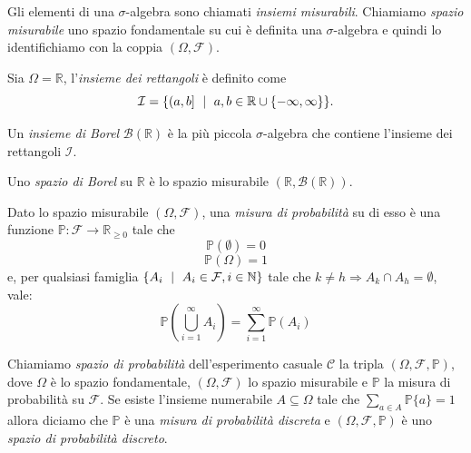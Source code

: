 Gli elementi di una $\sigma$-algebra sono chiamati \emph{insiemi misurabili}. Chiamiamo \emph{spazio misurabile} uno spazio fondamentale su cui è definita una $\sigma$-algebra e quindi lo identifichiamo con la coppia $(\Omega, \mathcal{F})$.

\begin{mtdef}
	Sia $\Omega=\mathbb{R}$, l'\emph{insieme dei rettangoli} è definito come $$ \mathcal{I} = \{(a,b] \mbox{ }\mid\mbox{ } a,b\in \mathbb{R} \cup \{-\infty,\infty\}\}. $$
\end{mtdef}

\begin{mtdef}
	Un \emph{insieme di Borel} $\mathcal{B}(\mathbb{R})$ è la più piccola $\sigma$-algebra che contiene l'insieme dei rettangoli $\mathcal{I}$.
\end{mtdef}

\begin{mtdef}
	Uno \emph{spazio di Borel} su $\mathbb{R}$ è lo spazio misurabile $(\mathbb{R},\mathcal{B}(\mathbb{R}))$.
\end{mtdef}

\begin{mtdef}
	Dato lo spazio misurabile $(\Omega,\mathcal{F})$, una \emph{misura di probabilità} su di esso è una funzione $\mathbb{P} : \mathcal{F} \rightarrow \mathbb{R}_{\geq 0}$ tale che
	\begin{equation*}
		\mathbb{P}(\emptyset) = 0
	\end{equation*}
	\begin{equation*}
		\mathbb{P}(\Omega) = 1
	\end{equation*}
	e, per qualsiasi famiglia $\{A_i \mbox{ }\mid\mbox{ } A_i \in \mathcal{F}, i \in \mathbb{N}\}$ tale che $k \neq h \Rightarrow A_k \cap A_h = \emptyset$, vale:
	\begin{equation*}
		 \mathbb{P}\left(\bigcup_{i=1}^\infty A_i\right) = \sum_{i=1}^\infty \mathbb{P}\left(A_i\right)
	\end{equation*}
\end{mtdef}

Chiamiamo \emph{spazio di probabilità} dell'esperimento casuale $\mathcal{C}$ la tripla $(\Omega, \mathcal{F}, \mathbb{P})$, dove $\Omega$ è lo spazio fondamentale, $(\Omega, \mathcal{F})$ lo spazio misurabile e $\mathbb{P}$ la misura di probabilità su $\mathcal{F}$.
Se esiste l'insieme numerabile $A \subseteq \Omega$ tale che $\sum_{a \in A} \mathbb{P}\{a\} = 1$ allora diciamo che $\mathbb{P}$ è una \emph{misura di probabilità discreta} e $(\Omega, \mathcal{F}, \mathbb{P})$ è uno \emph{spazio di probabilità discreto}.

